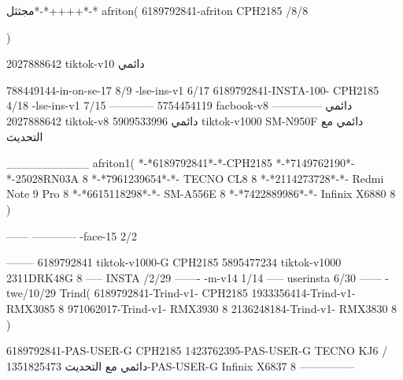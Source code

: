 مجثثل*-*++++*-*
afriton(
6189792841-afriton CPH2185  /8/8

)

2027888642 tiktok-v10
دائمي

788449144-in-on-se-17 8/9
-lse-ins-v1 6/17
6189792841-INSTA-100- CPH2185 4/18
-lse-ins-v1 7/15
------------
5754454119 facbook-v8
دائمي
--------------
2027888642 tiktok-v8
دائمي
5909533996 tiktok-v1000  SM-N950F
دائمي مع التحديث

__________
afriton1(
*-*6189792841*-*-CPH2185
*-*7149762190*-*-25028RN03A  8
*-*7961239654*-*- TECNO CL8  8
*-*2114273728*-*- Redmi Note 9 Pro  8
*-*6615118298*-*- SM-A556E  8
*-*7422889986*-*- Infinix X6880  8
)


------
------------
-face-15 2/2

--------
6189792841 tiktok-v1000-G CPH2185 
5895477234 tiktok-v1000 2311DRK48G 8
-----
 INSTA /2/29
-------
-m-v14 1/14
-----
userinsta 6/30
------
-twe/10/29
Trind(
6189792841-Trind-v1- CPH2185 
1933356414-Trind-v1- RMX3085 8
971062017-Trind-v1- RMX3930 8
2136248184-Trind-v1- RMX3830 8
)


6189792841-PAS-USER-G CPH2185 
1423762395-PAS-USER-G TECNO KJ6  /دائمي مع التحديث
1351825473-PAS-USER-G Infinix X6837 8
    ---------------
